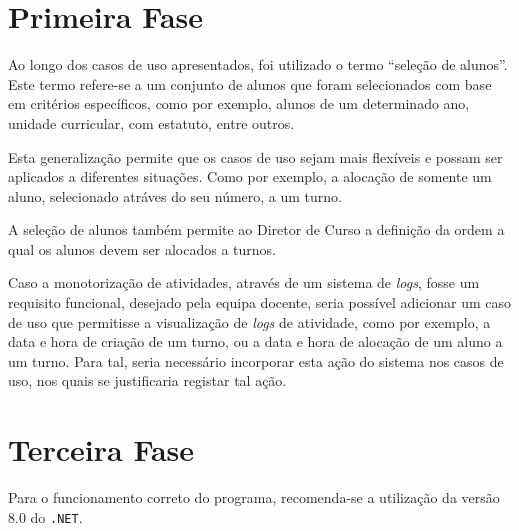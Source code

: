 \documentclass[a4paper,12pt]{scrreprt}
\begin{document}
\section{Primeira Fase}

Ao longo dos casos de uso apresentados, foi utilizado o termo “seleção de alunos”.
Este termo refere-se a um conjunto de alunos que foram selecionados com base em critérios específicos,
como por exemplo, alunos de um determinado ano, unidade curricular, com estatuto, entre outros.

Esta generalização permite que os casos de uso sejam mais flexíveis
e possam ser aplicados a diferentes situações. Como por exemplo, a alocação de somente
um aluno, selecionado atráves do seu número, a um turno.

A seleção de alunos também permite ao Diretor de Curso a definição da ordem
a qual os alunos devem ser alocados a turnos.

\vspace{1cm}

Caso a monotorização de atividades, através de um sistema de \textit{logs}, fosse um requisito funcional,
desejado pela equipa docente, seria possível adicionar um caso de uso que permitisse a visualização
de \textit{logs} de atividade, como por exemplo, a data e hora de criação de um turno,
ou a data e hora de alocação de um aluno a um turno. Para tal, seria necessário
incorporar esta ação do sistema nos casos de uso, nos quais se justificaria registar tal ação.

\section{Terceira Fase}

Para o funcionamento correto do programa, recomenda-se a utilização da versão 8.0 do \texttt{.NET}.




\end{document}
